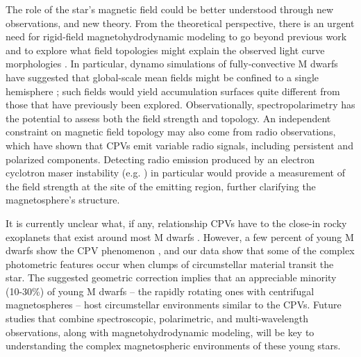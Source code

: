 \documentclass{nature3}
\begin{document}
The role of the star's magnetic field could be better understood
through new observations, and new theory.  From the theoretical
perspective, there is an urgent need for rigid-field
magnetohydrodynamic modeling to go beyond previous work
\cite{Townsend2005,Townsend2008,Krticka2022} and to explore what field
topologies might explain the observed light curve morphologies
\cite{Bouma2024}.  In particular, dynamo simulations of
fully-convective M dwarfs have suggested that global-scale mean fields
might be confined to a single hemisphere \cite{Brown2020}; such fields
would yield accumulation surfaces quite different from those that have
previously been explored.  Observationally, spectropolarimetry has the
potential to assess both the field strength and topology.  An
independent constraint on magnetic field topology may also come from
radio observations, which have shown \cite{Kaur2024} that CPVs emit
variable radio signals, including persistent and polarized components.
Detecting radio emission produced by an electron cyclotron maser
instability (e.g. \cite{Callingham2021}) in particular would provide a
measurement of the field strength at the site of the emitting region,
further clarifying the magnetosphere's structure.

It is currently unclear what, if any, relationship CPVs have to the
close-in rocky exoplanets that exist around most M dwarfs
\cite{Dressing2015}.  However, a few percent of young M dwarfs show the CPV
phenomenon \cite{Rebull2020}, and our data show that some of the
complex photometric features occur when clumps of circumstellar
material transit the star.  The suggested geometric correction implies
that an appreciable minority (10-30\%) of young M dwarfs -- the
rapidly rotating ones with centrifugal magnetospheres -- host
circumstellar environments similar to the CPVs.  Future studies that
combine spectroscopic, polarimetric, and multi-wavelength
observations, along with magnetohydrodynamic modeling, will be key to
understanding the complex magnetospheric environments of these young
stars.



\end{document}
